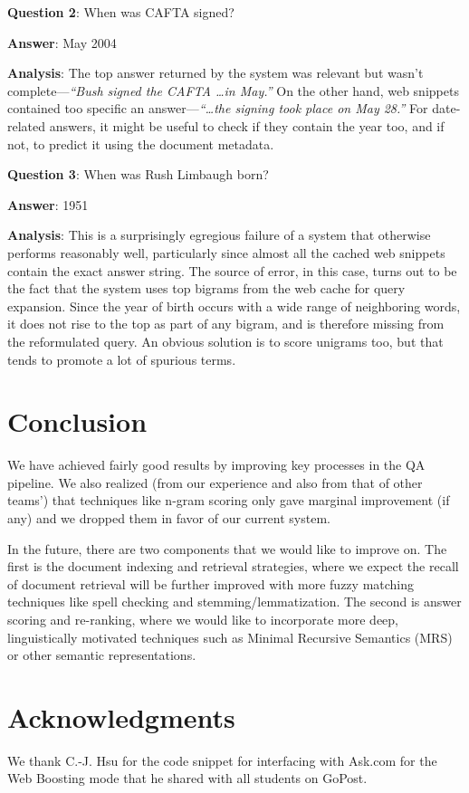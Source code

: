 \documentclass[11pt]{article}
\begin{document}
\noindent \textbf{Question 2}: When was CAFTA signed? 

\noindent \textbf{Answer}: May 2004

\noindent \textbf{Analysis}: The top answer returned by the system was relevant but wasn't complete---\emph{``Bush signed the CAFTA \ldots in May.''} On the other hand, web snippets contained too specific an answer---\emph{``\ldots the signing took place on May 28.''} For date-related answers, it might be useful to check if they contain the year too, and if not, to predict it using the document metadata.

\noindent \textbf{Question 3}: When was Rush Limbaugh born?

\noindent \textbf{Answer}: 1951

\noindent \textbf{Analysis}:
This is a surprisingly egregious failure of a system that otherwise performs reasonably well, particularly since almost all the cached web snippets contain the exact answer string. The source of error, in this case, turns out to be the fact that the system uses top bigrams from the web cache for query expansion. Since the year of birth occurs with a wide range of neighboring words, it does not rise to the top as part of any bigram, and is therefore missing from the reformulated query. An obvious solution is to score unigrams too, but that tends to promote a lot of spurious terms.

\section{Conclusion}
We have achieved fairly good results by improving key processes in the QA pipeline. We also realized (from our experience and also from that of other teams') that techniques like n-gram scoring only gave marginal improvement (if any) and we dropped them in favor of our current system. 

In the future, there are two components that we would like to improve on. The first is the document indexing and retrieval strategies, where we expect the recall of document retrieval will be further improved with more fuzzy matching techniques like spell checking and stemming/lemmatization. The second is answer scoring and re-ranking, where we would like to incorporate more deep, linguistically motivated techniques such as Minimal Recursive Semantics (MRS) or other semantic representations.



\section*{Acknowledgments}
We thank C.-J. Hsu for the code snippet for interfacing with Ask.com for the Web Boosting mode that he shared with all students on GoPost.

\printbibliography
\end{document}
